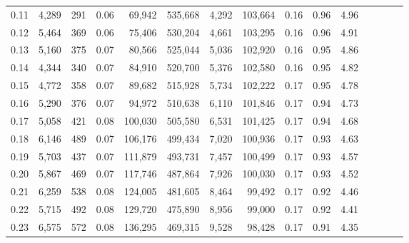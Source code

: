 \begin{tabular}{rrrcrrrrrrrrrrr}
0.11 &   4,289 &    291 &                                       0.06 &   69,942 &  535,668 &    4,292 &  103,664 &  0.16 &  0.96 &                         4.96 \\
0.12 &   5,464 &    369 &                                       0.06 &   75,406 &  530,204 &    4,661 &  103,295 &  0.16 &  0.96 &                         4.91 \\
0.13 &   5,160 &    375 &                                       0.07 &   80,566 &  525,044 &    5,036 &  102,920 &  0.16 &  0.95 &                         4.86 \\
0.14 &   4,344 &    340 &                                       0.07 &   84,910 &  520,700 &    5,376 &  102,580 &  0.16 &  0.95 &                         4.82 \\
0.15 &   4,772 &    358 &                                       0.07 &   89,682 &  515,928 &    5,734 &  102,222 &  0.17 &  0.95 &                         4.78 \\
0.16 &   5,290 &    376 &                                       0.07 &   94,972 &  510,638 &    6,110 &  101,846 &  0.17 &  0.94 &                         4.73 \\
0.17 &   5,058 &    421 &                                       0.08 &  100,030 &  505,580 &    6,531 &  101,425 &  0.17 &  0.94 &                         4.68 \\
0.18 &   6,146 &    489 &                                       0.07 &  106,176 &  499,434 &    7,020 &  100,936 &  0.17 &  0.93 &                         4.63 \\
0.19 &   5,703 &    437 &                                       0.07 &  111,879 &  493,731 &    7,457 &  100,499 &  0.17 &  0.93 &                         4.57 \\
0.20 &   5,867 &    469 &                                       0.07 &  117,746 &  487,864 &    7,926 &  100,030 &  0.17 &  0.93 &                         4.52 \\
0.21 &   6,259 &    538 &                                       0.08 &  124,005 &  481,605 &    8,464 &   99,492 &  0.17 &  0.92 &                         4.46 \\
0.22 &   5,715 &    492 &                                       0.08 &  129,720 &  475,890 &    8,956 &   99,000 &  0.17 &  0.92 &                         4.41 \\
0.23 &   6,575 &    572 &                                       0.08 &  136,295 &  469,315 &    9,528 &   98,428 &  0.17 &  0.91 &                         4.35 \\

\end{tabular}
